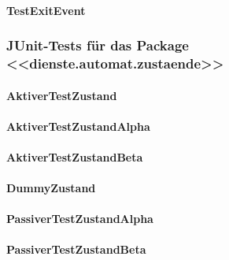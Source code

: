 \documentclass[12pt,halfparskip]{scrartcl}
\begin{document}
		\paragraph{TestExitEvent}\label{ssub:testexitevent} %
		
	\subsubsection{JUnit-Tests für das Package <<dienste.automat.zustaende>>}\label{ssub:junit_tests_für_das_package_dienste_automat_} %
		\paragraph{AktiverTestZustand}\label{ssub:aktivertestzustand} %
		
		\paragraph{AktiverTestZustandAlpha}\label{ssub:aktivertestzustandalpha} %
		
		\paragraph{AktiverTestZustandBeta}\label{ssub:aktivertestzustandbeta} %
		
		\paragraph{DummyZustand}\label{ssub:dummyzustand} %
		
		\paragraph{PassiverTestZustandAlpha}\label{ssub:passivertestzustandalpha} %
		
		\paragraph{PassiverTestZustandBeta}\label{ssub:passivertestzustandbeta} %
		
\end{document}
